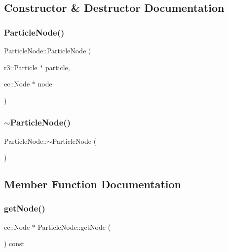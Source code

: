 \subsection{Constructor \& Destructor Documentation}
\mbox{\label{class_particle_node_a39d9346a90936874b5093445aedca01c}} 
\subsubsection{\texorpdfstring{Particle\+Node()}{ParticleNode()}}
{\footnotesize\ttfamily Particle\+Node\+::\+Particle\+Node (\begin{DoxyParamCaption}\item[{r3\+::\+Particle $\ast$}]{particle,  }\item[{ec\+::\+Node $\ast$}]{node }\end{DoxyParamCaption})\hspace{0.3cm}{\ttfamily [explicit]}}

\mbox{\label{class_particle_node_a7ecd9860e75bd4ec3842cc0d0a09cf8b}} 
\subsubsection{\texorpdfstring{$\sim$\+Particle\+Node()}{~ParticleNode()}}
{\footnotesize\ttfamily Particle\+Node\+::$\sim$\+Particle\+Node (\begin{DoxyParamCaption}{ }\end{DoxyParamCaption})\hspace{0.3cm}{\ttfamily [default]}}



\subsection{Member Function Documentation}
\mbox{\label{class_particle_node_add76b91ffda0c229d0d4f1876e671894}} 
\subsubsection{\texorpdfstring{get\+Node()}{getNode()}}
{\footnotesize\ttfamily ec\+::\+Node $\ast$ Particle\+Node\+::get\+Node (\begin{DoxyParamCaption}{ }\end{DoxyParamCaption}) const}

